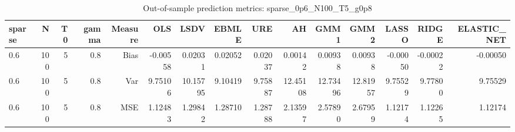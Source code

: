 \begin{table}[!htbp]\centering
\caption{Out-of-sample prediction metrics: sparse_0p6_N100_T5_g0p8}
\label{tab:table3_sparse_0p6_N100_T5_g0p8}
\begin{tabular}{lrrrrrrrrrrrrrr}
\hline
sparse & N & T0 & gamma & Measure & OLS & LSDV & EBMLE & URE & AH & GMM1 & GMM2 & LASSO & RIDGE & ELASTIC_NET \\
\hline
0.6 & 100 & 5 & 0.8 & Bias & -0.00558 & 0.02031 & 0.02052 & 0.02037 & 0.00142 & 0.00938 & 0.00938 & -0.00050 & -0.00022 & -0.00050 \\
0.6 & 100 & 5 & 0.8 & Var & 9.75106 & 10.15795 & 9.10419 & 9.75887 & 12.45108 & 12.73496 & 12.81957 & 9.75529 & 9.77800 & 9.75529 \\
0.6 & 100 & 5 & 0.8 & MSE & 1.12483 & 1.29842 & 1.28710 & 1.28788 & 2.13597 & 2.57890 & 2.67959 & 1.12174 & 1.12265 & 1.12174 \\
\hline
\end{tabular}
\end{table}

